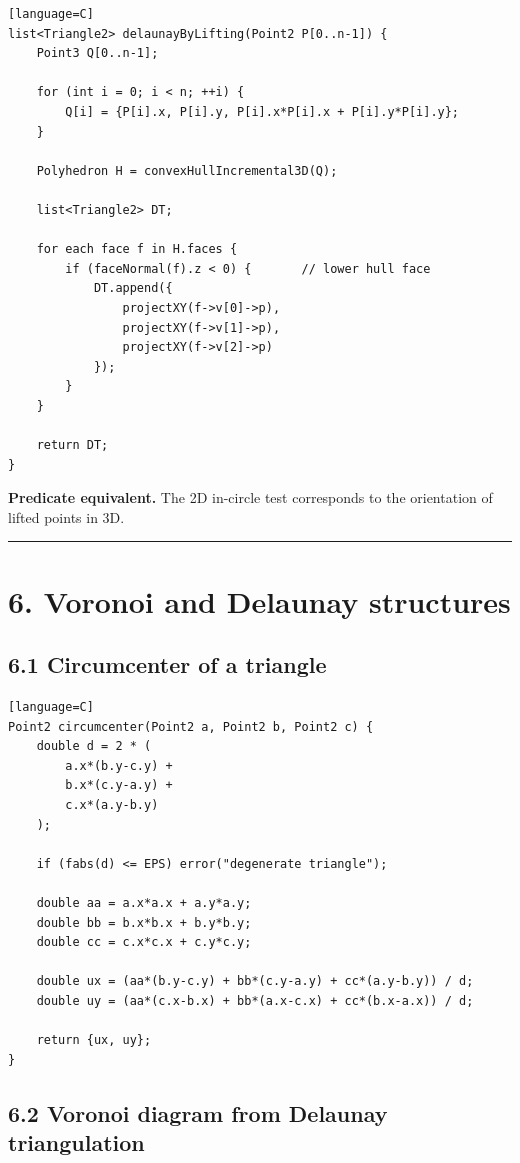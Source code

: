 \documentclass[11pt]{article}
\begin{document}
\begin{verbatim}[language=C]
list<Triangle2> delaunayByLifting(Point2 P[0..n-1]) {
    Point3 Q[0..n-1];

    for (int i = 0; i < n; ++i) {
        Q[i] = {P[i].x, P[i].y, P[i].x*P[i].x + P[i].y*P[i].y};
    }

    Polyhedron H = convexHullIncremental3D(Q);

    list<Triangle2> DT;

    for each face f in H.faces {
        if (faceNormal(f).z < 0) {       // lower hull face
            DT.append({
                projectXY(f->v[0]->p),
                projectXY(f->v[1]->p),
                projectXY(f->v[2]->p)
            });
        }
    }

    return DT;
}
\end{verbatim}

\textbf{Predicate equivalent.} The 2D in-circle test corresponds to the
orientation of lifted points in 3D.

\begin{center}\rule{0.5\linewidth}{0.5pt}\end{center}

\section{6. Voronoi and Delaunay
structures}\label{voronoi-and-delaunay-structures}

\subsection{6.1 Circumcenter of a
triangle}\label{circumcenter-of-a-triangle}

\begin{verbatim}[language=C]
Point2 circumcenter(Point2 a, Point2 b, Point2 c) {
    double d = 2 * (
        a.x*(b.y-c.y) +
        b.x*(c.y-a.y) +
        c.x*(a.y-b.y)
    );

    if (fabs(d) <= EPS) error("degenerate triangle");

    double aa = a.x*a.x + a.y*a.y;
    double bb = b.x*b.x + b.y*b.y;
    double cc = c.x*c.x + c.y*c.y;

    double ux = (aa*(b.y-c.y) + bb*(c.y-a.y) + cc*(a.y-b.y)) / d;
    double uy = (aa*(c.x-b.x) + bb*(a.x-c.x) + cc*(b.x-a.x)) / d;

    return {ux, uy};
}
\end{verbatim}

\subsection{6.2 Voronoi diagram from Delaunay
triangulation}\label{voronoi-diagram-from-delaunay-triangulation}
\end{document}
